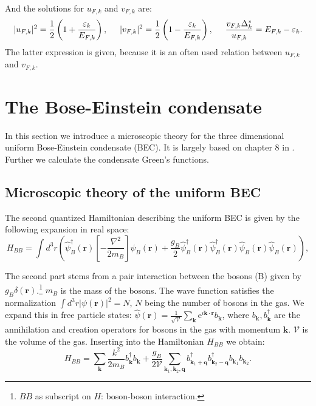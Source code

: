 And the solutions for $u_{F,k}$ and $v_{F,k}$ are: 
\begin{equation}
|u_{F,k}|^2 = \frac{1}{2}\left(1 + \frac{\varepsilon_k}{E_{F,k}}\right), \hspace{0.5cm} |v_{F,k}|^2 = \frac{1}{2}\left(1-\frac{\varepsilon_k}{E_{F,k}}\right), \hspace{0.5cm} \frac{v_{F,k}\Delta^*_k}{u_{F,k}}=E_{F,k}-\varepsilon_k.
\label{eq.Kitaev.uk_vk}
\end{equation}
The latter expression is given, because it is an often used relation between $u_{F,k}$ and $v_{F,k}$. 


\section{The Bose-Einstein condensate}
In this section we introduce a microscopic theory for the three dimensional uniform Bose-Einstein condensate (BEC). It is largely based on chapter 8 in \cite{Pethick}. Further we calculate the condensate Green's functions. 

\subsection{Microscopic theory of the uniform BEC}
\label{sec.BEC}
The second quantized Hamiltonian describing the uniform BEC is given by the following expansion in real space: 
\begin{equation}
H_{BB} = \int d^3 r \left(\hat{\psi}_B^\dagger(\mathbf{r})\left[-\frac{\nabla^2}{2m_B}\right]\hat{\psi}_B(\mathbf{r}) + \frac{g_B}{2}\hat{\psi}_B^\dagger(\mathbf{r})\hat{\psi}_B^\dagger(\mathbf{r})\hat{\psi}_B(\mathbf{r})\hat{\psi}_B(\mathbf{r})  \right), 
\end{equation}

The second part stems from a pair interaction between the bosons (B) given by $g_B\delta(\mathbf{r})$.\footnote{$BB$ as subscript on $H$: boson-boson interaction.} $m_B$ is the mass of the bosons. The wave function satisfies the normalization $\int d^3 r |\psi(\mathbf{r})|^2 = N$, $N$ being the number of bosons in the gas. We expand this in free particle states: $\hat{\psi}(\mathbf{r}) = \frac{1}{\sqrt{\mathcal{V}}}\sum_\mathbf{k} \text{e}^{i\mathbf{k}\cdot\mathbf{r}}b_\mathbf{k}$, where $b_\mathbf{k}, b^\dagger_\mathbf{k}$ are the annihilation and creation operators for bosons in the gas with momentum $\mathbf{k}$. $\mathcal{V}$ is the volume of the gas. Inserting into the Hamiltonian $H_{BB}$ we obtain: 
\begin{equation}
H_{BB} = \sum_\mathbf{k} \frac{k^2}{2m_B}b_\mathbf{k}^\dagger b_\mathbf{k} + \frac{g_B}{2\mathcal{V}}\sum_{\mathbf{k}_1,\mathbf{k}_2,\mathbf{q}} b^\dagger_{\mathbf{k}_1+\mathbf{q}}b^\dagger_{\mathbf{k}_2-\mathbf{q}}b_{\mathbf{k}_1}b_{\mathbf{k}_2}.  
\end{equation}

